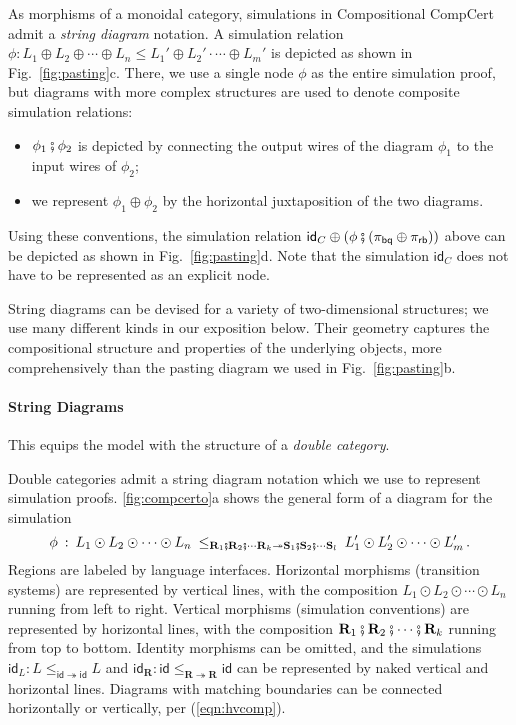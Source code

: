 \documentclass[acmsmall,screen,review,anonymous]{acmart}
\newcommand{\kw}[1]{\ensuremath{ \mathsf{#1} }}
\newcommand{\vcomp}{\fatsemi}
\begin{document}
As morphisms of a monoidal category,
simulations in Compositional CompCert
admit a \emph{string diagram} notation.
A simulation relation
$
  \phi : L_1 \oplus L_2 \oplus \cdots \oplus L_n \le
        L_1' \oplus L_2' \cdot \cdots \oplus L_m'
$
is depicted as shown in Fig.~\ref{fig:pasting}c.
There, we use a single node $\phi$
as the entire simulation proof,
but diagrams with more complex structures
are used to denote composite simulation relations:
\begin{itemize}
\item
$\phi_1 \vcomp \phi_2$
is depicted
by connecting the output wires of
the diagram $\phi_1$
to the input wires of $\phi_2$;
\item
we represent
$\phi_1 \oplus \phi_2$
by the horizontal juxtaposition of the two diagrams.
\end{itemize}
Using these conventions,
the simulation relation
$\kw{id}_C \oplus (\phi \vcomp (\pi_\kw{bq} \oplus \pi_\kw{rb}))$
above can be depicted
as shown in Fig.~\ref{fig:pasting}d.
Note that the simulation $\kw{id}_C$
does not have to be represented as an explicit node.

String diagrams can be devised for a variety of 
two-dimensional structures;
we use many different kinds in our exposition below.
Their geometry
captures the compositional structure and properties
of the underlying objects,
more comprehensively %
than the pasting diagram
we used in Fig.~\ref{fig:pasting}b.


\paragraph{String Diagrams} %

This equips the model
with the structure of a \emph{double category}.

Double categories admit a
string diagram notation \cite{dcsd}
which we use to represent simulation proofs.
\autoref{fig:compcerto}a shows the general form
of a diagram for the simulation
\[
  \phi \: : \:
  L_1 \odot L_2 \odot \cdots \odot L_n
  \: \le_{
    \mathbf{R}_1 \vcomp \mathbf{R}_2 \vcomp \cdots \mathbin \mathbf{R}_k
    \twoheadrightarrow
    \mathbf{S}_1 \vcomp \mathbf{S}_2 \vcomp \cdots \mathbin \mathbf{S}_l
  } \:
  L_1' \odot L_2' \odot \cdots \odot L_m'
  \,.
\]
Regions %
are labeled by language interfaces.
Horizontal morphisms (transition systems)
are represented by vertical lines,
with the composition
$L_1 \odot L_2 \odot \cdots \odot L_n$
running from left to right.
Vertical morphisms (simulation conventions)
are represented by horizontal lines,
with the composition
$\mathbf{R}_1 \vcomp \mathbf{R}_2 \vcomp \cdots \vcomp \mathbf{R}_k$
running from top to bottom.
Identity morphisms can be omitted,
and the simulations
$
  \kw{id}_L :
    L \le_{\kw{id} \twoheadrightarrow \kw{id}} L
$ and $
  \kw{id}_\mathbf{R} :
    \kw{id} \le_{\mathbf{R} \twoheadrightarrow \mathbf{R}} \kw{id}
$
can be represented by naked vertical and horizontal lines.
Diagrams with matching boundaries
can be connected horizontally or vertically,
per (\ref{eqn:hvcomp}).
\end{document}
